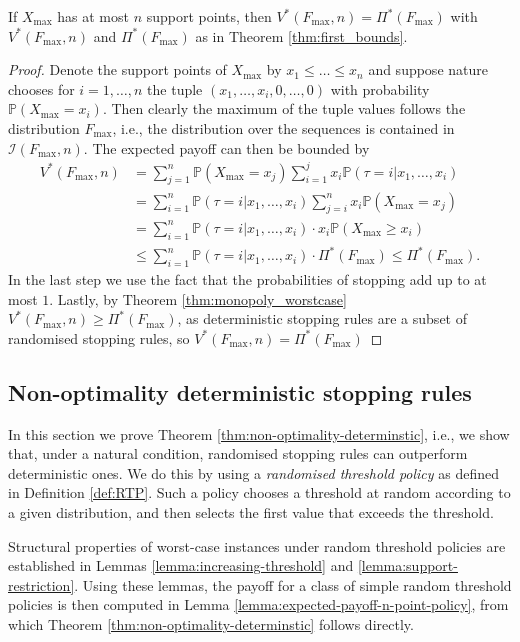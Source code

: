 \documentclass[11pt,a4paper]{article}
\numberwithin{equation}{section}
\begin{document}
\begin{lemma}
    If $X_{\max}$ has at most $n$ support points, then $V^*(F_{\max},n)=\Pi^*(F_{\max})$ with $V^*(F_{\max},n)$ and $\Pi^*(F_{\max})$ as in Theorem \ref{thm:first_bounds}.
\end{lemma}
\begin{proof}
    Denote the support points of $X_{\max}$ by $x_1\le \dots\le x_n$ and suppose nature chooses for $i = 1,\dots,n$ the tuple $(x_1,\dots,x_i,0,\dots,0)$ with probability 
    $\mathbb{P}(X_{\max} = x_i)$. Then clearly the maximum of the tuple values follows the distribution 
$F_{\max}$, i.e., the distribution over the sequences is contained in $\mathcal{I}(F_{\max},n)$.
    The expected payoff can then be bounded by
    \begin{align*}
       V^*(F_{\max},n) &=\sum_{j=1}^n\mathbb{P}(X_{\max}=x_j)\sum_{i=1}^jx_i\mathbb{P}(\tau=i|x_1,\dots,x_i)\\
       &=\sum_{i=1}^n\mathbb{P}(\tau=i|x_1,\dots,x_i)\sum_{j=i}^nx_i\mathbb{P}(X_{\max}=x_j)\\
        &=\sum_{i=1}^n\mathbb{P}(\tau=i|x_1,\dots,x_i)\cdot x_i\mathbb{P}(X_{\max}\ge x_i)\\
        &\le\sum_{i=1}^n\mathbb{P}(\tau=i|x_1,\dots,x_i)\cdot\Pi^*(F_{\max})\le \Pi^*(F_{\max}).
    \end{align*}
    In the last step we use the fact that the probabilities of stopping add up to at most $1$.
    Lastly, by Theorem \ref{thm:monopoly_worstcase} $V^*(F_{\max},n)\ge\Pi^*(F_{\max})$, as deterministic stopping rules are a subset of randomised stopping rules, so $V^*(F_{\max},n)=\Pi^*(F_{\max})$
\end{proof}


\subsection{Non-optimality deterministic stopping rules}
In this section we prove Theorem \ref{thm:non-optimality-determinstic}, i.e., we show that, under a natural condition, randomised stopping rules can outperform deterministic ones. We do this by using a \textit{randomised threshold policy} as defined in Definition \ref{def:RTP}. Such a policy chooses a threshold at random according to a given distribution, and then selects the first value that exceeds the threshold.

Structural properties of worst-case instances under random threshold policies are established in Lemmas \ref{lemma:increasing-threshold} and \ref{lemma:support-restriction}.
Using these lemmas, the payoff for a class of simple random threshold policies is then computed in Lemma \ref{lemma:expected-payoff-n-point-policy}, from which Theorem \ref{thm:non-optimality-determinstic} follows directly.
\end{document}
